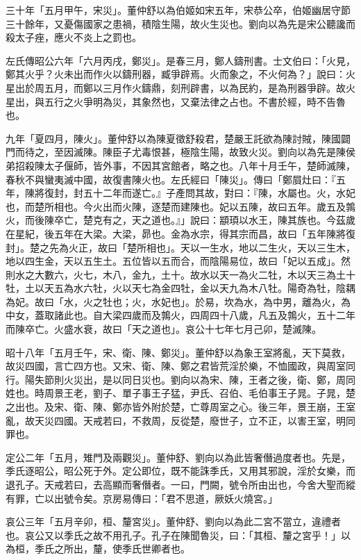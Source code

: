 \begin{pinyinscope}
三十年「五月甲午，宋災」。董仲舒以為伯姬如宋五年，宋恭公卒，伯姬幽居守節三十餘年，又憂傷國家之患禍，積陰生陽，故火生災也。劉向以為先是宋公聽讒而殺太子痤，應火不炎上之罰也。

左氏傳昭公六年「六月丙戌，鄭災」。是春三月，鄭人鑄刑書。士文伯曰：「火見，鄭其火乎？火未出而作火以鑄刑器，臧爭辟焉。火而象之，不火何為？」說曰：火星出於周五月，而鄭以三月作火鑄鼎，刻刑辟書，以為民約，是為刑器爭辟。故火星出，與五行之火爭明為災，其象然也，又棄法律之占也。不書於經，時不告魯也。

九年「夏四月，陳火」。董仲舒以為陳夏徵舒殺君，楚嚴王託欲為陳討賊，陳國闢門而待之，至因滅陳。陳臣子尤毒恨甚，極陰生陽，故致火災。劉向以為先是陳侯弟招殺陳太子偃師，皆外事，不因其宮館者，略之也。八年十月壬午，楚師滅陳，春秋不與蠻夷滅中國，故復書陳火也。左氏經曰「陳災」。傳曰「鄭屓灶曰：『五年，陳將復封，封五十二年而遂亡。』子產問其故，對曰：『陳，水屬也。火，水妃也，而楚所相也。今火出而火陳，逐楚而建陳也。妃以五陳，故曰五年。歲五及鶉火，而後陳卒亡，楚克有之，天之道也。』」說曰：顓頊以水王，陳其族也。今茲歲在星紀，後五年在大梁。大梁，昴也。金為水宗，得其宗而昌，故曰「五年陳將復封」。楚之先為火正，故曰「楚所相也」。天以一生水，地以二生火，天以三生木，地以四生金，天以五生土。五位皆以五而合，而陰陽易位，故曰「妃以五成」。然則水之大數六，火七，木八，金九，土十。故水以天一為火二牡，木以天三為土十牡，土以天五為水六牡，火以天七為金四牡，金以天九為木八牡。陽奇為牡，陰耦為妃。故曰「水，火之牡也；火，水妃也」。於易，坎為水，為中男，離為火，為中女，蓋取諸此也。自大梁四歲而及鶉火，四周四十八歲，凡五及鶉火，五十二年而陳卒亡。火盛水衰，故曰「天之道也」。哀公十七年七月己卯，楚滅陳。

昭十八年「五月壬午，宋、衛、陳、鄭災」。董仲舒以為象王室將亂，天下莫救，故災四國，言亡四方也。又宋、衛、陳、鄭之君皆荒淫於樂，不恤國政，與周室同行。陽失節則火災出，是以同日災也。劉向以為宋、陳，王者之後，衛、鄭，周同姓也。時周景王老，劉子、單子事王子猛，尹氏、召伯、毛伯事王子晁。子晁，楚之出也。及宋、衛、陳、鄭亦皆外附於楚，亡尊周室之心。後三年，景王崩，王室亂，故天災四國。天戒若曰，不救周，反從楚，廢世子，立不正，以害王室，明同罪也。

定公二年「五月，雉門及兩觀災」。董仲舒、劉向以為此皆奢僭過度者也。先是，季氏逐昭公，昭公死于外。定公即位，既不能誅季氏，又用其邪說，淫於女樂，而退孔子。天戒若曰，去高顯而奢僭者。一曰，門闕，號令所由出也，今舍大聖而縱有罪，亡以出號令矣。京房易傳曰：「君不思道，厥妖火燒宮。」

哀公三年「五月辛卯，桓、釐宮災」。董仲舒、劉向以為此二宮不當立，違禮者也。哀公又以季氏之故不用孔子。孔子在陳聞魯災，曰：「其桓、釐之宮乎！」以為桓，季氏之所出，釐，使季氏世卿者也。


\end{pinyinscope}
